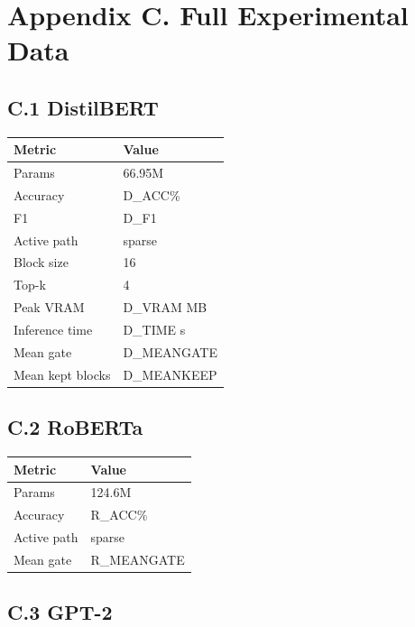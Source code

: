 \section{Appendix C. Full Experimental Data}

\subsection{C.1 DistilBERT}

\begin{table}[H]
\centering
\small
\begin{tabular}{ll}
\toprule
\textbf{Metric} & \textbf{Value} \\
\midrule
Params & 66.95M \\
Accuracy & {{D\_ACC}}\% \\
F1 & {{D\_F1}} \\
Active path & sparse \\
Block size & 16 \\
Top-k & 4 \\
Peak VRAM & {{D\_VRAM}} MB \\
Inference time & {{D\_TIME}} s \\
Mean gate & {{D\_MEANGATE}} \\
Mean kept blocks & {{D\_MEANKEEP}} \\
\bottomrule
\end{tabular}
\end{table}

\subsection{C.2 RoBERTa}

\begin{table}[H]
\centering
\small
\begin{tabular}{ll}
\toprule
\textbf{Metric} & \textbf{Value} \\
\midrule
Params & 124.6M \\
Accuracy & {{R\_ACC}}\% \\
Active path & sparse \\
Mean gate & {{R\_MEANGATE}} \\
\bottomrule
\end{tabular}
\end{table}

\subsection{C.3 GPT-2}

